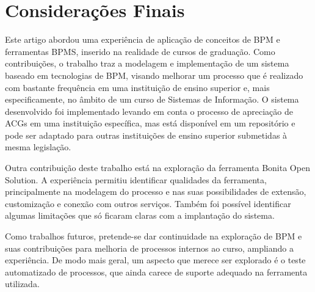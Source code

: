 \documentclass[12pt]{article}
\begin{document}


\section{Considerações Finais}

Este artigo abordou uma experiência de aplicação de conceitos de BPM e ferramentas BPMS, inserido na realidade de cursos de graduação. Como contribuições, o trabalho traz a modelagem e implementação de um sistema baseado em tecnologias de BPM, visando melhorar um processo que é realizado com bastante frequência em uma instituição de ensino superior e, mais especificamente, no âmbito de um curso de Sistemas de Informação. O sistema desenvolvido foi implementado levando em conta o processo de apreciação de ACGs em uma instituição específica, mas está disponível em um repositório e pode ser adaptado para outras instituições de ensino superior submetidas à mesma legislação.

Outra contribuição deste trabalho está na exploração da ferramenta Bonita Open Solution. A experiência permitiu identificar qualidades da ferramenta, principalmente na modelagem do processo e nas suas possibilidades de extensão, customização e conexão com outros serviços. Também foi possível identificar algumas limitações que só ficaram claras com a implantação do sistema.


Como trabalhos futuros, pretende-se dar continuidade na exploração de BPM e suas contribuições para melhoria de processos internos ao curso, ampliando a experiência. De modo mais geral, um aspecto que merece ser explorado é o teste automatizado de processos, que ainda carece de suporte adequado na ferramenta utilizada.






\end{document}
